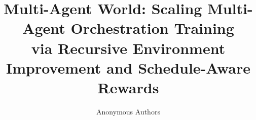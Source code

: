 \documentclass{article}
\title{Multi-Agent World: Scaling Multi-Agent Orchestration Training\\ via Recursive Environment Improvement and Schedule-Aware Rewards}
\author{Anonymous Authors}
\begin{document}
\raggedbottom

\maketitle

\begin{abstract}

\end{abstract}








\FloatBarrier



\clearpage
\appendix

\end{document}
